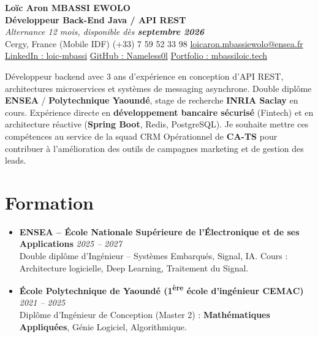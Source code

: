 \documentclass[a4paper,11pt]{article}
\begin{document}
\begin{center}
    {\Large \textbf{Loïc Aron MBASSI EWOLO}} \\ \vspace{4pt}
    \textbf{\large Développeur Back-End Java / API REST} \\
    \textit{\small Alternance 12 mois, disponible dès \textbf{septembre 2026}} \\ \vspace{4pt}
    \small
     Cergy, France (Mobile IDF) \quad
     (+33) 7 59 52 33 98 \quad
     \href{mailto:loicaron.mbassiewolo@ensea.fr}{loicaron.mbassiewolo@ensea.fr} \\ \vspace{2pt}
    \href{https://www.linkedin.com/in/loic-mbassi/}{LinkedIn : loic-mbassi} \quad
    \href{https://github.com/Nameless0l}{GitHub : Nameless0l} \quad
    \href{https://mbassiloic.tech}{Portfolio : mbassiloic.tech}
\end{center}

\vspace{-6pt}

\noindent\small{Développeur backend avec 3 ans d'expérience en conception d'API REST, architectures microservices et systèmes de messaging asynchrone. Double diplôme \textbf{ENSEA} / \textbf{Polytechnique Yaoundé}, stage de recherche \textbf{INRIA Saclay} en cours. Expérience directe en \textbf{développement bancaire sécurisé} (Fintech) et en architecture réactive (\textbf{Spring Boot}, Redis, PostgreSQL). Je souhaite mettre ces compétences au service de la squad CRM Opérationnel de \textbf{CA-TS} pour contribuer à l'amélioration des outils de campagnes marketing et de gestion des leads.}

\section{Formation}
\begin{itemize}[leftmargin=*, label=\tiny$\bullet$, nosep]
    \item \textbf{ENSEA -- École Nationale Supérieure de l'Électronique et de ses Applications} \hfill \textit{2025 -- 2027} \\
    \small{Double diplôme d'Ingénieur -- Systèmes Embarqués, Signal, IA. Cours : Architecture logicielle, Deep Learning, Traitement du Signal.}
    \item \textbf{École Polytechnique de Yaoundé (1\textsuperscript{ère} école d'ingénieur CEMAC)} \hfill \textit{2021 -- 2025} \\
    \small{Diplôme d'Ingénieur de Conception (Master 2) : \textbf{Mathématiques Appliquées}, Génie Logiciel, Algorithmique.}
\end{itemize}
\end{document}
